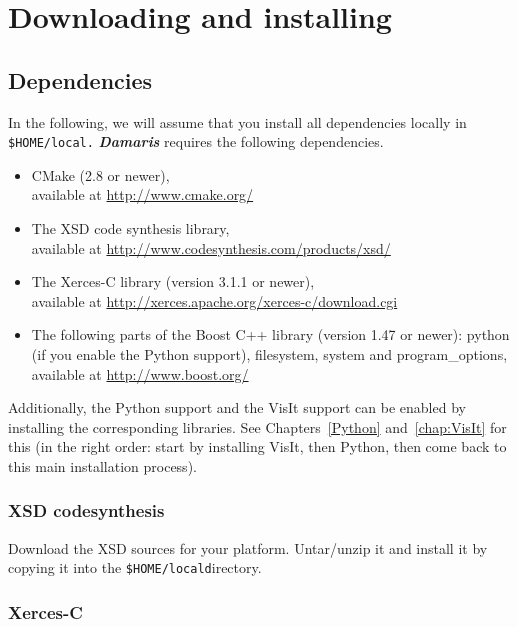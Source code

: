 \documentclass[11pt]{report}
\newcommand{\Damaris}{\emph{\textbf{Damaris}}}
\newcommand{\installdir}[1]{\texttt{\$HOME/local#1}}
\begin{document}
\chapter{Downloading and installing}\label{chap:downloadingAndInstalling}

\section{Dependencies}\label{sec:dependencies}

In the following, we will assume that you install all dependencies locally in \installdir.
\Damaris{} requires the following dependencies.
\begin{itemize}
	\item CMake (2.8 or newer), \\ available at \url{http://www.cmake.org/}
	\item The XSD code synthesis library, \\ available at \url{http://www.codesynthesis.com/products/xsd/}
	\item The Xerces-C library (version 3.1.1 or newer), \\
	available at \url{http://xerces.apache.org/xerces-c/download.cgi}
	\item The following parts of the Boost C++ library (version 1.47 or newer): python (if you enable the 
	Python support), filesystem, system and program\_options, available at \url{http://www.boost.org/}
\end{itemize}

Additionally, the Python support and the VisIt support can be enabled by installing the corresponding
libraries. See Chapters~\ref{Python} and~\ref{chap:VisIt} for this (in the right order: start by installing VisIt, then
Python, then come back to this main installation process).

\subsection{XSD codesynthesis}

Download the XSD sources for your platform.
Untar/unzip it and install it by copying it into the \installdir directory.

\subsection{Xerces-C}
\end{document}
